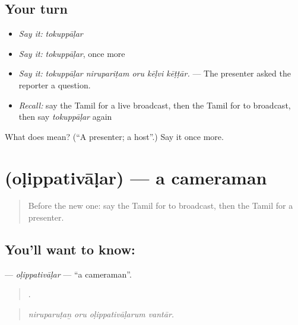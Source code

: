 \subsection*{Your turn}
\begin{itemize}
\raggedright
  \item \emph{Say it:} \emph{tokuppāḷar}
  \item \emph{Say it:} \emph{tokuppāḷar}, once more
  \item \emph{Say it:} \emph{tokuppāḷar nirupariṭam oru kēḷvi kēṭṭār.} — The presenter asked the reporter a question.
  \item \emph{Recall:} say the Tamil for a live broadcast, then the Tamil for to broadcast, then say \emph{tokuppāḷar} again
\end{itemize}

\begin{tcolorbox}[breakable,colback=teal!4,colframe=teal!35!black,title={Before you move on}]
What does  mean? (\textquotedblleft{}A presenter; a host\textquotedblright{}.) Say it once more.
\end{tcolorbox}
\section[\texorpdfstring{\ta{ஒளிப்பதிவாளர்} (oḷippativāḷar)}{ஒளிப்பதிவாளர் (oḷippativāḷar)}]{ (oḷippativāḷar) — a cameraman}

\label{lesson:TA-C305-olippativalar}



\begin{quote}
Before the new one: say the Tamil for to broadcast, then the Tamil for a presenter.
\end{quote}

\subsection*{You'll want to know: }
\textbf{} — \emph{oḷippativāḷar} — \textquotedblleft{}a cameraman\textquotedblright{}.

\begin{quote}
   .
\end{quote}

\begin{quote}
\emph{niruparuṭaṉ oru oḷippativāḷarum vantār.}
\end{quote}

